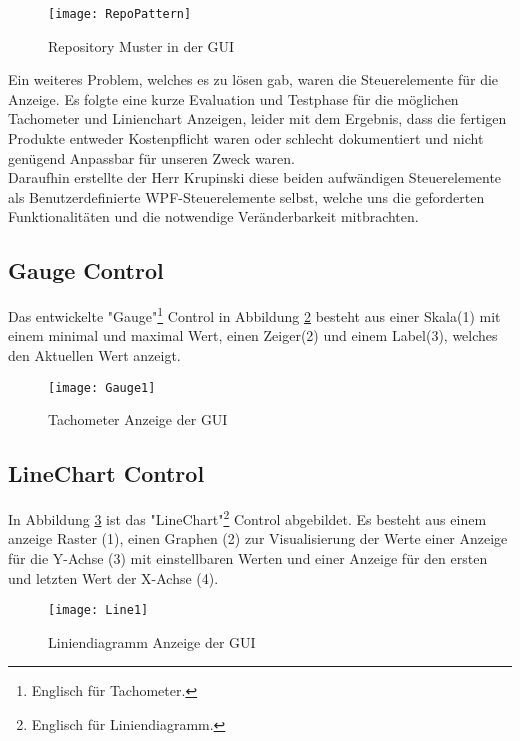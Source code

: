 \begin{figure}[ht]
	\centering
		\texttt{[image: RepoPattern]}
		\caption{Repository Muster in der GUI}
		\label{fig:repo}
\end{figure}

Ein weiteres Problem, welches es zu lösen gab, waren die Steuerelemente für die Anzeige. Es folgte eine kurze Evaluation und Testphase für die möglichen Tachometer und Linienchart Anzeigen, leider mit dem Ergebnis, dass die fertigen Produkte entweder Kostenpflicht waren oder schlecht dokumentiert und nicht genügend Anpassbar für unseren Zweck waren.\\

Daraufhin erstellte der Herr Krupinski diese beiden aufwändigen Steuerelemente als Benutzerdefinierte WPF-Steuerelemente selbst, welche uns die geforderten Funktionalitäten und die notwendige Veränderbarkeit mitbrachten. 



\subsection*{Gauge Control}
Das entwickelte "Gauge"\footnote{Englisch für Tachometer.} Control in Abbildung \ref{fig:gauge} besteht aus einer Skala(1) mit einem minimal und maximal Wert, einen Zeiger(2) und einem Label(3), welches den Aktuellen Wert anzeigt.

\begin{figure}[ht]
	\centering
		\texttt{[image: Gauge1]}
		\caption{Tachometer Anzeige der GUI}
		\label{fig:gauge}
\end{figure}

\subsection*{LineChart Control}

In Abbildung \ref{fig:line} ist das "LineChart"\footnote{Englisch für Liniendiagramm.} Control abgebildet. Es besteht aus einem anzeige Raster (1), einen Graphen (2) zur Visualisierung der Werte einer Anzeige für die Y-Achse (3) mit einstellbaren Werten und einer Anzeige für den ersten und letzten Wert der X-Achse (4).

\begin{figure}[ht]
	\centering
	\texttt{[image: Line1]}
	\caption{Liniendiagramm Anzeige der GUI}
	\label{fig:line}
\end{figure}

